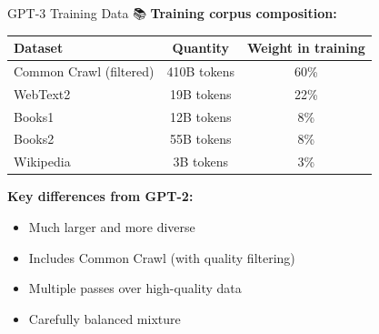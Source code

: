 \documentclass[aspectratio=169]{beamer}
\begin{document}
\begin{frame}{GPT-3 Training Data 📚}
    \textbf{Training corpus composition:}

    \vspace{0.3cm}

    \begin{table}
        \small
        \begin{tabular}{lcc}
            \toprule
            \textbf{Dataset} & \textbf{Quantity} & \textbf{Weight in training} \\
            \midrule
            Common Crawl (filtered) & 410B tokens & 60\% \\
            WebText2 & 19B tokens & 22\% \\
            Books1 & 12B tokens & 8\% \\
            Books2 & 55B tokens & 8\% \\
            Wikipedia & 3B tokens & 3\% \\
            \bottomrule
        \end{tabular}
    \end{table}

    \vspace{0.3cm}

    \textbf{Key differences from GPT-2:}
    \begin{itemize}\setlength{\itemsep}{0pt}
        \item Much larger and more diverse
        \item Includes Common Crawl (with quality filtering)
        \item Multiple passes over high-quality data
        \item Carefully balanced mixture
    \end{itemize}
\end{frame}
\end{document}
